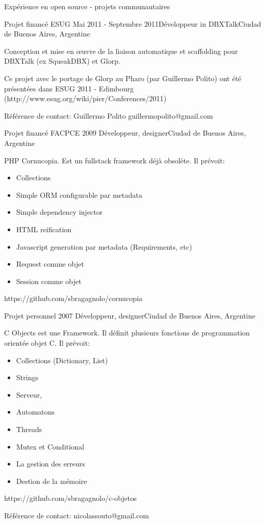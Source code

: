 \documentclass{resume} %
\begin{document}
\begin{rSection}{Exp\'{e}rience en open source - projets communautaires}
 
\begin{rSubsection}{Projet financ\'{e} ESUG}{ Mai 2011 - Septembre 2011}{D\'{e}veloppeur in DBXTalk}{Ciudad de Buenos Aires, Argentine}
	\item Conception et mise en œuvre de la liaison automatique et scaffolding pour DBXTalk (ex SqueakDBX) et Glorp.
	\item Ce projet avec le portage de Glorp au Pharo (par Guillermo Polito) ont \'{e}t\'{e} pr\'{e}sent\'{e}es dans ESUG 2011 - Edimbourg (http://www.esug.org/wiki/pier/Conferences/2011)
	\item  R\'{e}f\'{e}rence de contact:  Guillermo Polito guillermopolito@gmail.com
\end{rSubsection}

\begin{rSubsection}{Projet financ\'{e} FACPCE }{ 2009 }{D\'{e}veloppeur, designer}{Ciudad de Buenos Aires, Argentine}	
	\item PHP Cornucopia. Est un fullstack framework d\'{e}j\`{a} obsol\`{e}te. Il pr\'{e}voit:
	\begin{itemize}
		\item Collections
		\item Simple ORM configurable par metadata 
		\item Simple dependency injector
		\item HTML reification 
		\item Javascript generation par metadata (Requirements, etc)
		\item Request comme objet
		\item Session comme objet
	\end{itemize}
	\item https://github.com/sbragagnolo/cornucopia
\end{rSubsection}


\begin{rSubsection}{Projet personnel}{ 2007 }{D\'{e}veloppeur, designer}{Ciudad de Buenos Aires, Argentine}
	\item C Objects est une Framework. Il d\'{e}finit plusieurs fonctions de programmation orient\'{e}e objet  C. Il pr\'{e}voit:
	\begin{itemize}
		\item Collections (Dictionary, List) 
		\item Strings
		\item Serveur, 
		\item Automatons
		\item Threads 
		\item Mutex et Conditional
		\item La gestion des erreurs
		\item Destion de la m\'{e}moire
	\end{itemize}
	\item https://github.com/sbragagnolo/c-objetos
	\item R\'{e}f\'{e}rence de contact: nicolassouto@gmail.com
\end{rSubsection}


\end{rSection}
\end{document}
